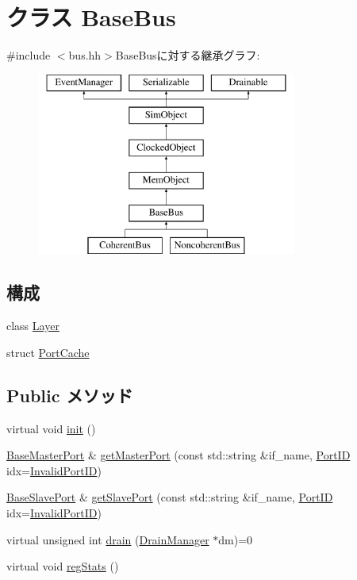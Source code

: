 \hypertarget{classBaseBus}{
\section{クラス BaseBus}
\label{classBaseBus}
}


{\ttfamily \#include $<$bus.hh$>$}BaseBusに対する継承グラフ:\begin{figure}[H]
\begin{center}
\leavevmode
\includegraphics[height=6cm]{classBaseBus}
\end{center}
\end{figure}
\subsection*{構成}
\begin{DoxyCompactItemize}
\item 
class \hyperlink{classBaseBus_1_1Layer}{Layer}
\item 
struct \hyperlink{structBaseBus_1_1PortCache}{PortCache}
\end{DoxyCompactItemize}
\subsection*{Public メソッド}
\begin{DoxyCompactItemize}
\item 
virtual void \hyperlink{classBaseBus_a02fd73d861ef2e4aabb38c0c9ff82947}{init} ()
\item 
\hyperlink{classBaseMasterPort}{BaseMasterPort} \& \hyperlink{classBaseBus_adc4e675e51defbdd1e354dac729d0703}{getMasterPort} (const std::string \&if\_\-name, \hyperlink{base_2types_8hh_acef4d7d41cb21fdc252e20c04cd7bb8e}{PortID} idx=\hyperlink{base_2types_8hh_a65bf40f138cf863f0c5e2d8ca1144126}{InvalidPortID})
\item 
\hyperlink{classBaseSlavePort}{BaseSlavePort} \& \hyperlink{classBaseBus_ac918a145092d7514ebc6dbd952dceafb}{getSlavePort} (const std::string \&if\_\-name, \hyperlink{base_2types_8hh_acef4d7d41cb21fdc252e20c04cd7bb8e}{PortID} idx=\hyperlink{base_2types_8hh_a65bf40f138cf863f0c5e2d8ca1144126}{InvalidPortID})
\item 
virtual unsigned int \hyperlink{classBaseBus_ac8c1510f7e1591e75a5c79b4b873f6b4}{drain} (\hyperlink{classDrainManager}{DrainManager} $\ast$dm)=0
\item 
virtual void \hyperlink{classBaseBus_a4dc637449366fcdfc4e764cdf12d9b11}{regStats} ()
\end{DoxyCompactItemize}

